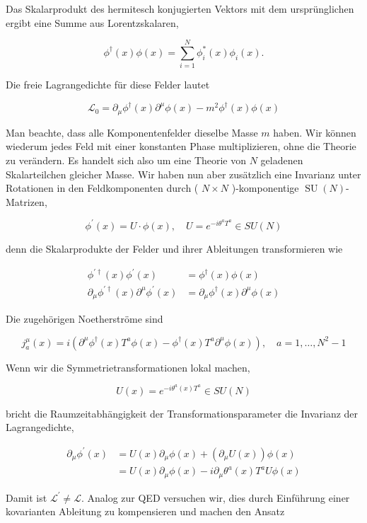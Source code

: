 \documentclass[10pt, letterpaper]{article}
\begin{document}
Das Skalarprodukt des hermitesch konjugierten Vektors mit dem ursprünglichen ergibt eine Summe aus Lorentzskalaren,

$$
\phi^{\dagger}(x) \phi(x)=\sum_{i=1}^{N} \phi_{i}^{*}(x) \phi_{i}(x) .
$$

Die freie Lagrangedichte für diese Felder lautet

$$
\mathscr{L}_{0}=\partial_{\mu} \phi^{\dagger}(x) \partial^{\mu} \phi(x)-m^{2} \phi^{\dagger}(x) \phi(x)
$$

Man beachte, dass alle Komponentenfelder dieselbe Masse $m$ haben. Wir können wiederum jedes Feld mit einer konstanten Phase multiplizieren, ohne die Theorie zu verändern. Es handelt sich also um eine Theorie von $N$ geladenen Skalarteilchen gleicher Masse. Wir haben nun aber zusätzlich eine Invarianz unter Rotationen in den Feldkomponenten durch ( $N \times N$ )-komponentige $\operatorname{SU}(N)$-Matrizen,

$$
\phi^{\prime}(x)=U \cdot \phi(x), \quad U=e^{-i \theta^{a} T^{a}} \in S U(N)
$$

denn die Skalarprodukte der Felder und ihrer Ableitungen transformieren wie

$$
\begin{aligned}
\phi^{\prime \dagger}(x) \phi^{\prime}(x) & =\phi^{\dagger}(x) \phi(x) \\
\partial_{\mu} \phi^{\prime \dagger}(x) \partial^{\mu} \phi^{\prime}(x) & =\partial_{\mu} \phi^{\dagger}(x) \partial^{\mu} \phi(x)
\end{aligned}
$$

Die zugehörigen Noetherströme sind

$$
j_{a}^{\mu}(x)=i\left(\partial^{\mu} \phi^{\dagger}(x) T^{a} \phi(x)-\phi^{\dagger}(x) T^{a} \partial^{\mu} \phi(x)\right), \quad a=1, \ldots, N^{2}-1
$$

Wenn wir die Symmetrietransformationen lokal machen,

$$
U(x)=e^{-i \theta^{a}(x) T^{a}} \in S U(N)
$$

bricht die Raumzeitabhängigkeit der Transformationsparameter die Invarianz der Lagrangedichte,

$$
\begin{aligned}
\partial_{\mu} \phi^{\prime}(x) & =U(x) \partial_{\mu} \phi(x)+\left(\partial_{\mu} U(x)\right) \phi(x) \\
& =U(x) \partial_{\mu} \phi(x)-i \partial_{\mu} \theta^{a}(x) T^{a} U \phi(x)
\end{aligned}
$$

Damit ist $\mathscr{L}^{\prime} \neq \mathscr{L}$. Analog zur QED versuchen wir, dies durch Einführung einer kovarianten Ableitung zu kompensieren und machen den Ansatz
\end{document}

